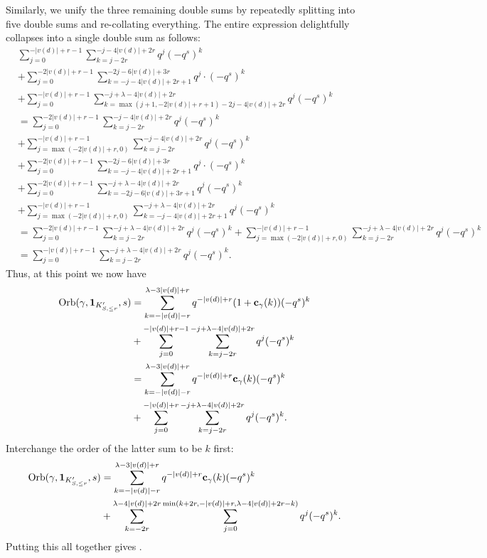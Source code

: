 Similarly, we unify the three remaining double sums by
repeatedly splitting into five double sums and re-collating everything.
The entire expression delightfully collapses into a single double sum as follows:
\begin{align*}
  &\sum_{j=0}^{-|v(d)|+r-1} \sum_{k = j - 2r}^{-j - 4|v(d)| + 2r} q^j (-q^s)^k \\
  &+ \sum_{j=0}^{-2|v(d)|+r-1}
    \sum_{k=-j-4|v(d)|+2r+1}^{-2j-6|v(d)|+3r}
    q^j \cdot (-q^s)^k \\
  &+ \sum_{j=0}^{-|v(d)|+r-1}
    \sum_{k=\max(j+1, -2|v(d)|+r+1) - 2j - 4|v(d)| + 2r}^{-j+\lambda-4|v(d)|+2r}
    q^j (-q^s)^k \\
  &= \sum_{j=0}^{-2|v(d)|+r-1} \sum_{k = j - 2r}^{-j - 4|v(d)| + 2r} q^j (-q^s)^k \\
  &+ \sum_{j=\max(-2|v(d)|+r,0)}^{-|v(d)|+r-1} \sum_{k = j - 2r}^{-j - 4|v(d)| + 2r} q^j (-q^s)^k \\
  &+ \sum_{j=0}^{-2|v(d)|+r-1}
    \sum_{k=-j-4|v(d)|+2r+1}^{-2j-6|v(d)|+3r}
    q^j \cdot (-q^s)^k \\
  &+ \sum_{j=0}^{-2|v(d)|+r-1}
    \sum_{k = -2j - 6|v(d)| + 3r + 1}^{-j+\lambda-4|v(d)|+2r}
    q^j (-q^s)^k \\
  &+ \sum_{j=\max(-2|v(d)|+r, 0)}^{-|v(d)|+r-1}
    \sum_{k = -j - 4|v(d)| + 2r + 1}^{-j+\lambda-4|v(d)|+2r}
    q^j (-q^s)^k \\
  &= \sum_{j=0}^{-2|v(d)|+r-1} \sum_{k = j - 2r}^{-j + \lambda - 4|v(d)| + 2r} q^j (-q^s)^k
    + \sum_{j=\max(-2|v(d)|+r,0)}^{-|v(d)|+r-1} \sum_{k = j - 2r}^{-j + \lambda - 4|v(d)| + 2r} q^j (-q^s)^k \\
  &= \sum_{j=0}^{-|v(d)|+r-1} \sum_{k = j - 2r}^{-j + \lambda - 4|v(d)| + 2r} q^j (-q^s)^k.
\end{align*}
Thus, at this point we now have
\begin{align*}
  \operatorname{Orb}(\gamma, \mathbf{1}_{K'_{S, \le r}}, s)
  &= \sum_{k=-|v(d)|-r}^{\lambda-3|v(d)|+r} q^{-|v(d)|+r} (1+\mathbf c_\gamma(k)) (-q^s)^k \\
  &+ \sum_{j=0}^{-|v(d)|+r-1} \sum_{k = j - 2r}^{-j + \lambda - 4|v(d)| + 2r} q^j (-q^s)^k \\
  &= \sum_{k=-|v(d)|-r}^{\lambda-3|v(d)|+r} q^{-|v(d)|+r} \mathbf c_\gamma(k) (-q^s)^k \\
  &+ \sum_{j=0}^{-|v(d)|+r} \sum_{k = j - 2r}^{-j + \lambda - 4|v(d)| + 2r} q^j (-q^s)^k.
\end{align*}
Interchange the order of the latter sum to be $k$ first:
\begin{align*}
  \operatorname{Orb}(\gamma, \mathbf{1}_{K'_{S, \le r}}, s)
  &= \sum_{k=-|v(d)|-r}^{\lambda-3|v(d)|+r} q^{-|v(d)|+r} \mathbf c_\gamma(k) (-q^s)^k \\
  &+ \sum_{k=-2r}^{\lambda-4|v(d)|+2r} \sum_{j=0}^{\min(k+2r, -|v(d)|+r, \lambda-4|v(d)|+2r-k)} q^j (-q^s)^k.
\end{align*}
Putting this all together gives .

